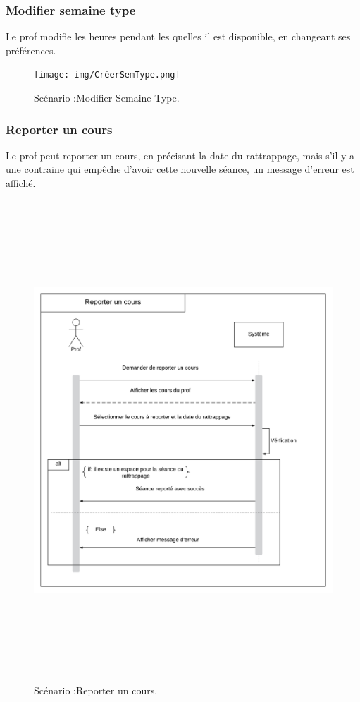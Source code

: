\subsubsection*{Modifier semaine type}
Le prof modifie les heures pendant les quelles il est disponible, en changeant ses préférences.
 \begin{figure}[!htb]
      \centering
        \texttt{[image: img/CréerSemType.png]}
        \caption{Scénario :Modifier Semaine Type. }
    \end{figure}
 \newpage
 \subsubsection*{Reporter un cours}
Le prof peut reporter un cours, en précisant la date du rattrappage, mais s'il y a une contraine qui empêche d'avoir cette nouvelle séance, un message d'erreur est affiché.
 \begin{figure}[!htb]
      \centering
        \includegraphics[width=15cm,height=18cm]{img/ReporterCours.png}
        \caption{Scénario :Reporter un cours. }
    \end{figure}   
\newpage
